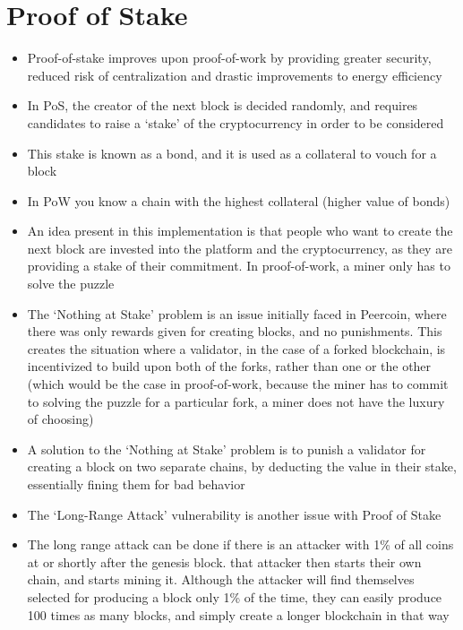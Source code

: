 \section{Proof of Stake}
\begin{itemize}
	\item Proof-of-stake improves upon proof-of-work by providing greater security, reduced risk of centralization and drastic improvements to energy efficiency
	\item In PoS, the creator of the next block is decided randomly, and requires candidates to raise a `stake' of the cryptocurrency in order to be considered
	\item This stake is known as a bond, and it is used as a collateral to vouch for a block
	\item In PoW you know a chain with the highest collateral (higher value of bonds)
	\item An idea present in this implementation is that people who want to create the next block are invested into the platform and the cryptocurrency, as they are providing a stake of their commitment. In proof-of-work, a miner only has to solve the puzzle
	\item The `Nothing at Stake' problem is an issue initially faced in Peercoin, where there was only rewards given for creating blocks, and no punishments. This creates the situation where a validator, in the case of a forked blockchain, is incentivized to build upon both of the forks, rather than one or the other (which would be the case in proof-of-work, because the miner has to commit to solving the puzzle for a particular fork, a miner does not have the luxury of choosing)
	\item A solution to the `Nothing at Stake' problem is to punish a validator for creating a block on two separate chains, by deducting the value in their stake, essentially fining them for bad behavior
	\item The `Long-Range Attack' vulnerability is another issue with Proof of Stake
	\item The long range attack can be done if there is an attacker with 1\% of all coins at or shortly after the genesis block. that attacker then starts their own chain, and starts mining it. Although the attacker will find themselves selected for producing a block only 1\% of the time, they can easily produce 100 times as many blocks, and simply create a longer blockchain in that way
\end{itemize}